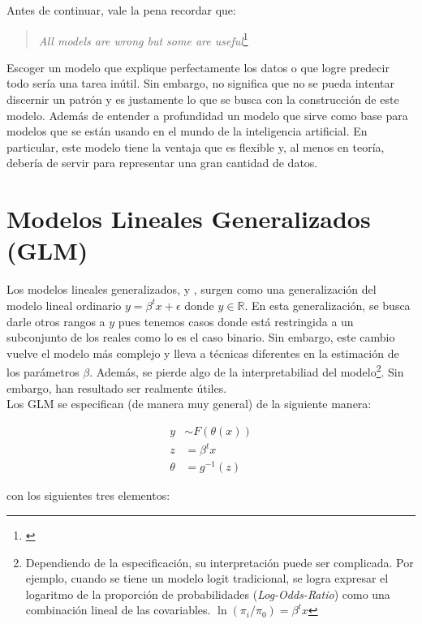 \documentclass[../Main/Main.tex]{subfiles}
\begin{document}
Antes de continuar, vale la pena recordar que:
\begin{quote}
\textit{All models are wrong but some are useful}\footnote{\autocite{box1979robustnessinthe}}
\end{quote}

Escoger un modelo que explique perfectamente los datos o que logre predecir todo sería una tarea inútil. Sin embargo, no significa que no se pueda intentar discernir un patrón y es justamente lo que se busca con la construcción de este modelo. Además de entender a profundidad un modelo que sirve como base para modelos que se están usando en el mundo de la inteligencia artificial. En particular, este modelo tiene la ventaja que es flexible y, al menos en teoría, debería de servir para representar una gran cantidad de datos.

\section{Modelos Lineales Generalizados (GLM)} \label{sec:GLM}
Los modelos lineales generalizados, \autocite{sundberg2016exponential} y \autocite{maccullagh1989generalized}, surgen como una generalización del modelo lineal ordinario $y = \beta^tx + \epsilon$ donde $y \in\mathbb{R}$. En esta generalización, se busca darle otros rangos a $y$ pues tenemos casos donde está restringida a un subconjunto de los reales como lo es el caso binario. Sin embargo, este cambio vuelve el modelo más complejo y lleva a técnicas diferentes en la estimación de los parámetros $\beta$. Además, se pierde algo de la interpretabiliad del modelo\footnote{Dependiendo de la especificación, su interpretación puede ser complicada. Por ejemplo, cuando se tiene un modelo logit tradicional, se logra expresar el logaritmo de la proporción de probabilidades (\textit{Log-Odds-Ratio}) como una combinación lineal de las covariables. $\ln(\pi_i / \pi_0) = \beta^t x$}. Sin embargo, han resultado ser realmente útiles. \\

Los GLM se especifican (de manera muy general) de la siguiente manera:

\begin{align*}
	y &\sim F(\theta(x)) \\
	z &= \beta^tx \\
	\theta &= g^{-1}(z) 
\end{align*}

con los siguientes tres elementos:
\end{document}
